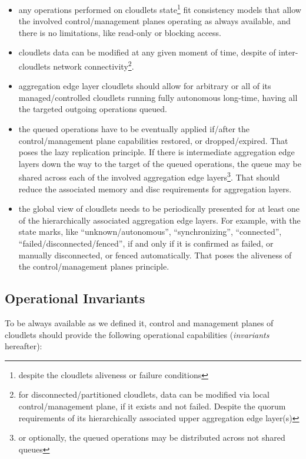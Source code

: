 \documentclass[conference]{IEEEtran}
\begin{document}
\begin{itemize}
  \item any operations performed on cloudlets state\footnote{despite the
    cloudlets aliveness or failure conditions} fit consistency models that
    allow the involved control/management planes operating as always available,
    and there is no limitations, like read-only or blocking access.
  \item cloudlets data can be modified at any given moment of time, despite of
    inter-cloudlets network connectivity\footnote{for disconnected/partitioned
    cloudlets, data can be modified via local control/management plane, if it
    exists and not failed. Despite the quorum requirements of its
    hierarchically associated upper aggregation edge layer(s)}.
  \item aggregation edge layer cloudlets should allow for arbitrary or all of
    its managed/controlled cloudlets running fully autonomous long-time, having
    all the targeted outgoing operations queued.
  \item the queued operations have to be eventually applied if/after the
    control/management plane capabilities restored, or dropped/expired. That
    poses the lazy replication principle. If there is intermediate
    aggregation edge layers down the way to the target of the queued operations,
    the queue may be shared across each of the involved aggregation edge
    layers\footnote{or optionally, the queued operations may be distributed
    across not shared queues}. That should reduce the associated memory and disc
    requirements for aggregation layers.
  \item the global view of cloudlets needs to be periodically presented for at
    least one of the hierarchically associated aggregation edge layers. For
    example, with the state marks, like ``unknown/autonomous'',
    ``synchronizing'', ``connected'', ``failed/disconnected/fenced'', if and
    only if it is confirmed as failed, or manually disconnected, or fenced
    automatically. That poses the aliveness of the control/management planes
    principle.
\end{itemize}

\subsection{Operational Invariants}

To be always available as we defined it, control and management planes of
cloudlets should provide the following operational capabilities
(\textit{invariants} hereafter):
\end{document}
